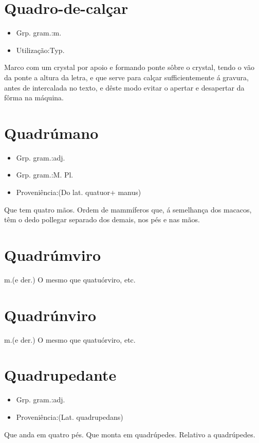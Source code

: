 \section{Quadro-de-calçar}
\begin{itemize}
\item {Grp. gram.:m.}
\end{itemize}
\begin{itemize}
\item {Utilização:Typ.}
\end{itemize}
Marco com um crystal por apoio e formando ponte sôbre o crystal, tendo o vão da ponte a altura da letra, e que serve para calçar sufficientemente á gravura, antes de intercalada no texto, e dêste modo evitar o apertar e desapertar da fôrma na máquina.
\section{Quadrúmano}
\begin{itemize}
\item {Grp. gram.:adj.}
\end{itemize}
\begin{itemize}
\item {Grp. gram.:M. Pl.}
\end{itemize}
\begin{itemize}
\item {Proveniência:(Do lat. \textunderscore quatuor\textunderscore  + \textunderscore manus\textunderscore )}
\end{itemize}
Que tem quatro mãos.
Ordem de mammíferos que, á semelhança dos macacos, têm o dedo pollegar separado dos demais, nos pés e nas mãos.
\section{Quadrúmviro}
\textunderscore m.\textunderscore  (e der.)
O mesmo que \textunderscore quatuórviro\textunderscore , etc.
\section{Quadrúnviro}
\textunderscore m.\textunderscore  (e der.)
O mesmo que \textunderscore quatuórviro\textunderscore , etc.
\section{Quadrupedante}
\begin{itemize}
\item {Grp. gram.:adj.}
\end{itemize}
\begin{itemize}
\item {Proveniência:(Lat. \textunderscore quadrupedans\textunderscore )}
\end{itemize}
Que anda em quatro pés.
Que monta em quadrúpedes.
Relativo a quadrúpedes.
